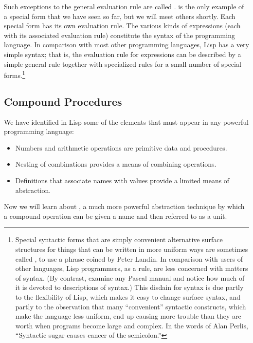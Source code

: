 Such exceptions to the general evaluation rule are called .   is the only example of a special form that we have seen
so far, but we will meet others shortly.  Each special form has its own
evaluation rule. The various kinds of expressions (each with its associated
evaluation rule) constitute the syntax of the programming language.  In
comparison with most other programming languages, Lisp has a very simple
syntax; that is, the evaluation rule for expressions can be described by a
simple general rule together with specialized rules for a small number of
special forms.\footnote{Special syntactic forms that are simply convenient
alternative surface structures for things that can be written in more uniform
ways are sometimes called , to use a phrase coined by
Peter Landin.  In comparison with users of other languages, Lisp programmers,
as a rule, are less concerned with matters of syntax.  (By contrast, examine
any Pascal manual and notice how much of it is devoted to descriptions of
syntax.)  This disdain for syntax is due partly to the flexibility of Lisp,
which makes it easy to change surface syntax, and partly to the observation
that many ``convenient'' syntactic constructs, which make the language less
uniform, end up causing more trouble than they are worth when programs become
large and complex.  In the words of Alan Perlis, ``Syntactic sugar causes
cancer of the semicolon.''}

\subsection{Compound Procedures}
\label{Section 1.1.4}

We have identified in Lisp some of the elements that must appear in any
powerful programming language:

\begin{itemize}

\item
Numbers and arithmetic operations are primitive data and procedures.

\item
Nesting of combinations provides a means of combining operations.

\item
Definitions that associate names with values provide a limited means of
abstraction.

\end{itemize}

\noindent
Now we will learn about , a much more powerful
abstraction technique by which a compound operation can be given a name and
then referred to as a unit.

